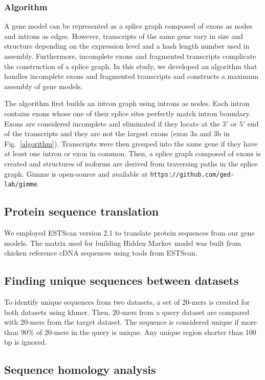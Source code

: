 \documentclass[10pt]{article}
\begin{document}
\subsubsection*{Algorithm}

A gene model can be represented as a splice graph composed of exons as nodes and introns as edges.
However, transcripts of the same gene vary in size and structure depending on the expression level and a hash length number used in assembly.
Furthermore, incomplete exons and fragmented transcripts complicate the construction of a splice graph.
In this study, we developed an algorithm that handles incomplete exons and fragmented transcripts and constructs a maximum assembly of gene models.

The algorithm first builds an intron graph using introns as nodes.
Each intron contains exons whose one of their splice sites perfectly match intron boundary.
Exons are considered incomplete and eliminated if they locate at the $3'$ or $5'$ end of the transcripts and
they are not the largest exons (exon 3a and 3b in Fig.~\ref{algorithm}).
Transcripts were then grouped into the same gene if they have at least one intron or exon in common.
Then, a splice graph composed of exons is created and structures of isoforms are derived from traversing paths in the splice graph.
Gimme is open-source and available at \texttt{https://github.com/ged-lab/gimme}.

\subsection*{Protein sequence translation}

We employed ESTScan version 2.1 to translate protein sequences from our gene models.
The matrix used for building Hidden Markov model was built from chicken reference cDNA sequences using tools from ESTScan.

\subsection*{Finding unique sequences between datasets}

To identify unique sequences from two datasets, a set of 20-mers is created for both datasets using
khmer\cite{khmer}.
Then, 20-mers from a query dataset are compared with 20-mers from the target dataset.
The sequence is considered unique if more than 90\% of 20-mers in the query is unique.
Any unique region shorter than 100 bp is ignored.

\subsection*{Sequence homology analysis}
\end{document}
